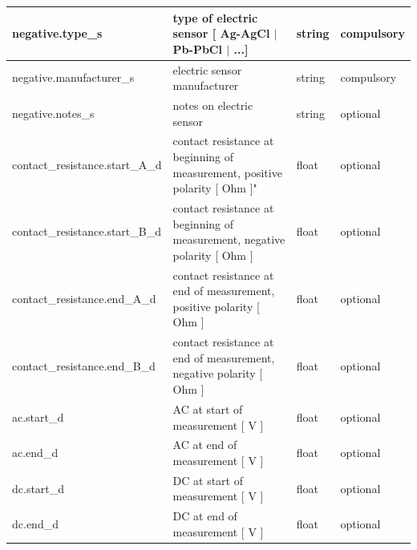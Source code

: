 \documentclass{article}
\begin{document}
\begin{table}[htb!]
\begin{tabular}{|l|p{3in}|l|l|}
		negative.type\_s & type of electric sensor [ Ag-AgCl $|$ Pb-PbCl $|$ ...] & string & compulsory \\ \hline
		negative.manufacturer\_s & electric sensor manufacturer & string & compulsory \\ \hline
		negative.notes\_s & notes on electric sensor & string & optional \\ \hline
		contact\_resistance.start\_A\_d & contact resistance at beginning of measurement, positive polarity [ Ohm ]" & float & optional \\ \hline
		contact\_resistance.start\_B\_d & contact resistance at beginning of measurement, negative polarity [ Ohm ] & float & optional \\ \hline
		contact\_resistance.end\_A\_d & contact resistance at end of measurement, positive polarity [ Ohm ] & float & optional \\ \hline
		contact\_resistance.end\_B\_d & contact resistance at end of measurement, negative polarity [ Ohm ] & float & optional \\ \hline
		ac.start\_d & AC at start of measurement [ V ] & float & optional \\ \hline
		ac.end\_d & AC at end of measurement [ V ] & float & optional \\ \hline
		dc.start\_d & DC at start of measurement [ V ] & float & optional \\ \hline
		dc.end\_d & DC at end of measurement [ V ] & float & optional \\ \hline
		
	\end{tabular}
	\label{tab:electric01}
\end{table}	
\end{document}
